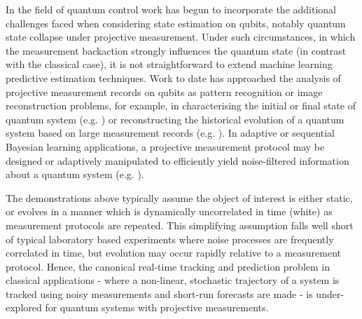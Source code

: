\documentclass[pra, reprint]{revtex4-1}
\begin{document}
In the field of quantum control work has begun to incorporate the additional challenges faced when considering state estimation on qubits, notably quantum state collapse under projective measurement.  Under such circumstances, in which the measurement backaction strongly influences the quantum state (in contrast with the classical case), it is not straightforward to extend machine learning predictive estimation techniques.  Work to date has approached the analysis of projective measurement records on qubits as pattern recognition or image reconstruction problems, for example, in characterising the initial or final state of quantum system (e.g. \cite{struchalin2016experimental, sergeevich2011characterization, mahler2013adaptive}) or reconstructing the historical evolution of a quantum system based on large measurement records (e.g. \cite{stenberg2016characterization, shabani2011efficient, shen2014reconstructing, de2016estimation, tan2015prediction, huang2017neural}). In adaptive or sequential Bayesian learning applications, a projective measurement protocol may be designed or adaptively manipulated to efficiently yield noise-filtered information about a quantum system (e.g. \cite{bonato2016optimized, wiebe2015bayesian}). 

The demonstrations above typically assume the object of interest is either static, or evolves in a manner which is dynamically uncorrelated in time (white) as measurement protocols are repeated. This simplifying assumption falls well short of typical laboratory based experiments where noise processes are frequently correlated in time, but evolution may occur rapidly relative to a measurement protocol.  Hence, the canonical real-time tracking and prediction problem in classical applications - where a non-linear, stochastic trajectory of a system is tracked using noisy measurements and short-run forecasts are made - is under-explored for quantum systems with projective measurements.
\end{document}

